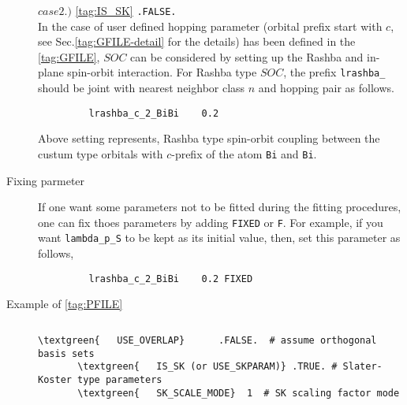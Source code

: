 \documentclass[a4paper,12pt]{scrartcl}
\makeatletter
\def\namedlabel#1#2{\begingroup
    #2%
    \def\@currentlabel{#2}%
    \phantomsection\label{#1}\endgroup
}
\newcommand{\textgreen}[1]{\textcolor{green!50!black}{\texttt{#1}}}
\makeatother
\begin{document}
\begin{description}
        \subitem $case 2.)$ \ref{tag:IS_SK} \texttt{.FALSE.} \\
		In the case of user defined hopping parameter (orbital prefix start with $c$,
		see Sec.\ref{tag:GFILE-detail} for the details) has been defined in the 
		\ref{tag:GFILE}, $SOC$ can be considered by setting up the Rashba and in-plane
		spin-orbit interaction.
		For Rashba type $SOC$, the prefix \texttt{lrashba\_} should be joint with 
		nearest neighbor class $n$ and hopping pair as follows.
        \begin{verbatim}
         lrashba_c_2_BiBi    0.2
        \end{verbatim}
		Above setting represents, Rashba type spin-orbit coupling between the
		custum type orbitals with $c$-prefix of the atom \texttt{Bi} and \texttt{Bi}.

	\item[\namedlabel{tag:param-fix}{Fixing parmeter}] $ $ \\
		If one want some parameters not to be fitted during the fitting 
		procedures, one can fix thoes parameters by adding \texttt{FIXED} or 
		\texttt{F}.
		For example, if you want \texttt{lambda\_p\_S} to be kept as its initial 
		value, then, set this parameter as follows,
        \begin{verbatim}
         lrashba_c_2_BiBi    0.2 FIXED
        \end{verbatim}

    \item[\namedlabel{tag:param-example}{Example of \ref{tag:PFILE}}] $ $\\

\begin{Verbatim}[commandchars=\\\{\},gobble=4, frame=single, framesep=2mm, 
    label= example of PFILE: PARAM\_FIT.dat for MoS$_2$ (IS\_SK  .TRUE.),
    labelposition=bottomline]
       \textgreen{   USE_OVERLAP}      .FALSE.  # assume orthogonal basis sets
       \textgreen{   IS_SK (or USE_SKPARAM)} .TRUE. # Slater-Koster type parameters  
       \textgreen{   SK_SCALE_MODE}  1  # SK scaling factor mode
       

\end{Verbatim}
\end{description}
\end{document}
